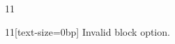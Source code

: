 \documentclass[paper=A4]{ropas-poster}
\begin{document}
\begin{postergrid}{1}{1}
\begin{posterblock}{1}{1}[text-size=0bp]
Invalid block option.
\end{posterblock}
\end{postergrid}
\end{document}
